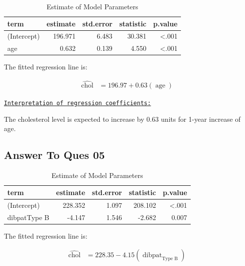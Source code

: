 \documentclass[
  12pt,
  oneside]{article}
\begin{document}
\begin{table}[H]

\caption{\label{tab:Table-06}Estimate of Model Parameters}
\centering
\begin{tabular}[t]{lrrrr}
\toprule
term & estimate & std.error & statistic & p.value\\
\midrule
(Intercept) & 196.971 & 6.483 & 30.381 & <.001\\
age & 0.632 & 0.139 & 4.550 & <.001\\
\bottomrule
\end{tabular}
\end{table}

The fitted regression line is:

\begin{equation}
\label{eq: eq1}
\begin{aligned}
\operatorname{\widehat{chol}} &= 196.97 + 0.63(\operatorname{age})
\end{aligned}
\end{equation}

\underline{\texttt{Interpretation of regression coefficients:}}

The cholesterol level is expected to increase by 0.63 units
for 1-year increase of age.

\hypertarget{answer-to-ques-05}{%
\subsection{Answer To Ques 05}\label{answer-to-ques-05}}

\begin{table}[H]

\caption{\label{tab:Table-07}Estimate of Model Parameters}
\centering
\begin{tabular}[t]{lrrrr}
\toprule
term & estimate & std.error & statistic & p.value\\
\midrule
(Intercept) & 228.352 & 1.097 & 208.102 & <.001\\
dibpatType B & -4.147 & 1.546 & -2.682 & 0.007\\
\bottomrule
\end{tabular}
\end{table}

The fitted regression line is:

\begin{equation}
\label{eq: eq2}
\begin{aligned}
\operatorname{\widehat{chol}} &= 228.35 - 4.15(\operatorname{dibpat}_{\operatorname{Type\ B}})
\end{aligned}
\end{equation}
\end{document}
